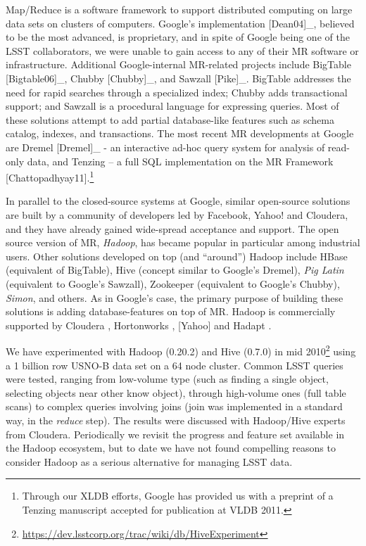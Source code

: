 \documentclass[DM,lsstdraft,toc]{lsstdoc}
\begin{document}
Map/Reduce is a software framework to support distributed computing on
large data sets on clusters of computers. Google's implementation
{[}Dean04{]}\_, believed to be the most advanced, is proprietary, and in
spite of Google being one of the LSST collaborators, we were unable to
gain access to any of their MR software or infrastructure. Additional
Google-internal MR-related projects include BigTable {[}Bigtable06{]}\_,
Chubby {[}Chubby{]}\_, and Sawzall {[}Pike{]}\_. BigTable addresses the
need for rapid searches through a specialized index; Chubby adds
transactional support; and Sawzall is a procedural language for
expressing queries. Most of these solutions attempt to add partial
database-like features such as schema catalog, indexes, and
transactions. The most recent MR developments at Google are Dremel
{[}Dremel{]}\_ - an interactive ad-hoc query system for analysis of
read-only data, and Tenzing -- a full SQL implementation on the MR
Framework {[}Chattopadhyay11{]}.\footnote{Through our
  XLDB efforts, Google has provided us with a
  preprint of a Tenzing manuscript accepted for publication at VLDB
  2011.}

In parallel to the closed-source systems at Google, similar open-source
solutions are built by a community of developers led by Facebook, Yahoo!
and Cloudera, and they have already gained wide-spread acceptance and
support. The open source version of MR, \emph{Hadoop}, has became
popular in particular among industrial users. Other solutions developed
on top (and ``around'') Hadoop include
HBase \citep{HBase} (equivalent of BigTable),
Hive \citep{Hive} (concept similar to
Google's Dremel), \emph{Pig Latin} (equivalent to Google's Sawzall),
Zookeeper
(equivalent to Google's Chubby), \emph{Simon}, and others. As in
Google's case, the primary purpose of building these solutions is adding
database-features on top of MR. Hadoop is commercially supported by
Cloudera \citep{Cloudera}, Hortonworks \citep{Hortonworks}, {[}Yahoo{]}
and Hadapt \citep{Hadapt}.

We have
experimented
with Hadoop (0.20.2) and Hive (0.7.0) in mid 2010\footnote{\url{https://dev.lsstcorp.org/trac/wiki/db/HiveExperiment}} using a 1 billion row
USNO-B data set on a 64 node cluster. Common LSST queries were tested,
ranging from low-volume type (such as finding a single object, selecting
objects near other know object), through high-volume ones (full table
scans) to complex queries involving joins (join was implemented in a
standard way, in the \emph{reduce} step). The results were discussed
with Hadoop/Hive experts from
Cloudera. Periodically we revisit the progress and feature set available
in the Hadoop ecosystem, but to date we have not found compelling
reasons to consider Hadoop as a serious alternative for managing LSST
data.
\end{document}
